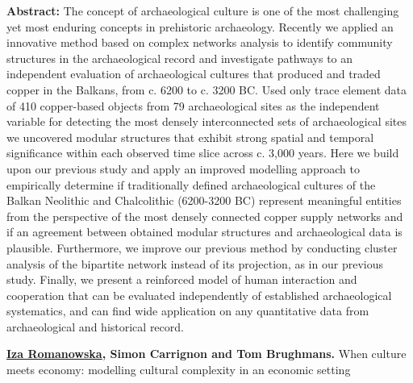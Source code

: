 \documentclass[]{article}
\begin{document}
\textbf{Abstract:} The concept of archaeological culture is one of the
most challenging yet most enduring concepts in prehistoric archaeology.
Recently we applied an innovative method based on complex networks
analysis to identify community structures in the archaeological record
and investigate pathways to an independent evaluation of archaeological
cultures that produced and traded copper in the Balkans, from c. 6200 to
c. 3200 BC. Used only trace element data of 410 copper-based objects
from 79 archaeological sites as the independent variable for detecting
the most densely interconnected sets of archaeological sites we
uncovered modular structures that exhibit strong spatial and temporal
significance within each observed time slice across c. 3,000 years. Here
we build upon our previous study and apply an improved modelling
approach to empirically determine if traditionally defined
archaeological cultures of the Balkan Neolithic and Chalcolithic
(6200-3200 BC) represent meaningful entities from the perspective of the
most densely connected copper supply networks and if an agreement
between obtained modular structures and archaeological data is
plausible. Furthermore, we improve our previous method by conducting
cluster analysis of the bipartite network instead of its projection, as
in our previous study. Finally, we present a reinforced model of human
interaction and cooperation that can be evaluated independently of
established archaeological systematics, and can find wide application on
any quantitative data from archaeological and historical record.

{\bf {\href{http://www.bsc.es/romanowska-iza}{Iza Romanowska}, Simon
Carrignon and Tom Brughmans}. }{When culture meets economy: modelling
cultural complexity in an economic setting}
\end{document}
